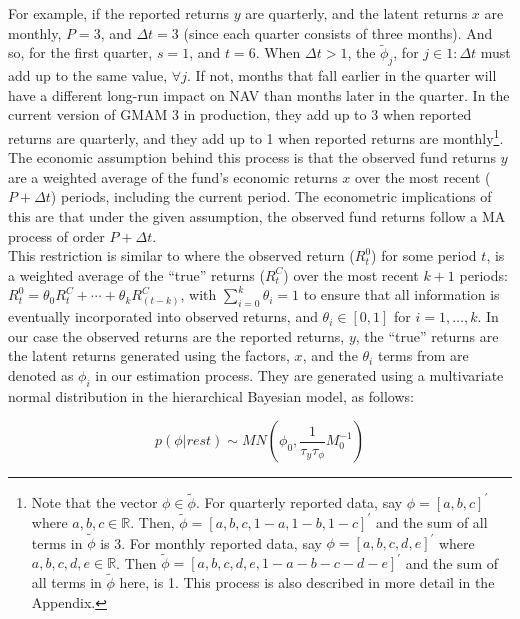 \documentclass[11pt]{article}
\begin{document}
For example, if the reported returns $y$ are quarterly, and the latent returns $x$ are monthly, $P=3$, and $\Delta t = 3$ (since each quarter consists of three months). And so, for the first quarter, $s = 1$, and $t = 6$. When $\Delta t > 1$, the $\tilde{\phi}_j$, for $j \in 1:\Delta t$ must add up to the same value, $\forall j$. If not, months that fall earlier in the quarter will have a different long-run impact on NAV than months later in the quarter. In the current version of GMAM 3 in production, they add up to 3 when reported returns are quarterly, and they add up to 1 when reported returns are monthly\footnote{Note that the vector $\phi \in \tilde{\phi}$. For quarterly reported data, say $\phi = [a, b, c]^\prime$ where $a, b, c \in \mathbb{R}$. Then, $\tilde{\phi} = [a, b, c, 1-a, 1-b, 1-c]^\prime$ and the sum of all terms in $\tilde{\phi}$ is 3. For monthly reported data, say $\phi = [a, b, c, d, e]^\prime$ where $a, b, c, d,e \in \mathbb{R}$. Then $\tilde{\phi} = [a, b, c, d, e, 1-a-b-c-d-e]^\prime$ and the sum of all terms in $\tilde{\phi}$ here, is 1. This process is also described in more detail in the Appendix.}.  \\

The economic assumption behind this process is that the observed fund returns $y$ are a weighted average of the fund’s economic returns $x$ over the most recent ($P + \Delta t$) periods, including the current period. The econometric implications of this are that under the given assumption, the observed fund returns follow a MA process of order $P + \Delta t$. \\

This restriction is similar to \cite{getmansky_etal} where the observed return ($R_t^0$) for some period $t$, is a weighted average of the 	``true'' returns ($R_t^C$) over the most recent $k+1$ periods: $R_t^0 = \theta_0 R_t^C + \cdots + \theta_k R_(t-k)^C$, with $\sum_{i=0}^k \theta_i  = 1$ to ensure that all information is eventually incorporated into observed returns, and $\theta_i \in [0,1]$ for $i = 1, \ldots, k$. In our case the observed returns are the reported returns, $y$, the ``true'' returns are the latent returns generated using the factors, $x$, and the $\theta_i$ terms from \cite{getmansky_etal} are denoted as $\phi_i$ in our estimation process. They are generated using a multivariate normal distribution in the hierarchical Bayesian model, as follows:

\begin{equation}
\label{eq:phi_dist}
	p\left(\phi|rest\right) \sim MN\left(\phi_{0},\frac{1}{\tau_{y}\tau_{\phi}}M_{0}^{-1}\right)
\end{equation}
\end{document}
